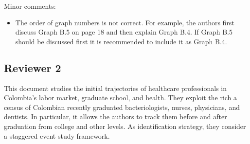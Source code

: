 \documentclass[12pt]{article}
\begin{document}
Minor comments:
\begin{itemize}
    \item The order of graph numbers is not correct. For example, the authors first discuss Graph B.5 on page 18 and then explain Graph B.4. If Graph B.5 should be discussed first it is recommended to include it as Graph B.4.
\end{itemize}

\subsection{Reviewer 2}  

This document studies the initial trajectories of healthcare professionals in Colombia's
labor market, graduate school, and health. They exploit the rich a census of Colombian recently graduated bacteriologists, nurses, physicians, and dentists. In particular, it allows the authors to track them before and after graduation from college and other levels. As identification strategy, they consider a staggered event study framework.
\end{document}
